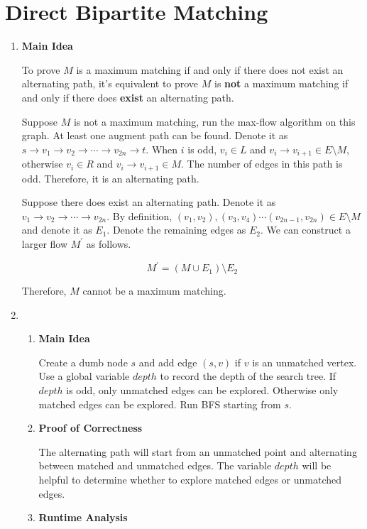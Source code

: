 \documentclass[11pt]{article}
\newenvironment{qparts}{\begin{enumerate}[{(}a{)}]}{\end{enumerate}}
\begin{document}
\newpage
\section{Direct Bipartite Matching}
\begin{qparts}
	\item \textbf{Main Idea}
	
	To prove $M$ is a maximum matching if and only if there does not exist an alternating path, it's equivalent to prove $M$ is \textbf{not} a maximum matching if and only if there does \textbf{exist} an alternating path.
	
	Suppose $M$ is not a maximum matching, run the max-flow algorithm on this graph. At least one augment path can be found. Denote it as $s \to v_1 \to v_2 \to \cdots \to v_{2n} \to t$. When $i$ is odd, $v_i \in L$ and $v_i \to v_{i+1} \in E \setminus M$, otherwise $v_i \in R$ and $v_i \to v_{i+1} \in M$. The number of edges in this path is odd. Therefore, it is an alternating path.
	
	Suppose there does exist an alternating path. Denote it as $v_1 \to v_2 \to \cdots \to v_{2n}$. By definition, $(v_1, v_2), (v_3, v_4) \cdots (v_{2n-1}, v_{2n}) \in E \setminus M$ and denote it as $E_1$. Denote the remaining edges as $E_2$. We can construct a larger flow $M^\prime$ as follows.
	
	\[
		M^\prime = (M \cup E_1) \setminus E_2
	\]
	
	Therefore, $M$ cannot be a maximum matching.
	
	\item
	\renewcommand{\theenumii}{\roman{enumii}}
	\begin{enumerate}
		\item \textbf{Main Idea}
		
		Create a dumb node $s$ and add edge $(s, v)$ if $v$ is an unmatched vertex. Use a global variable $depth$ to record the depth of the search tree. If $depth$ is odd, only unmatched edges can be explored. Otherwise only matched edges can be explored. Run BFS starting from $s$.
		
		\item \textbf{Proof of Correctness}
		
		The alternating path will start from an unmatched point and alternating between matched and unmatched edges. The variable $depth$ will be helpful to determine whether to explore matched edges or unmatched edges.
		
		\item \textbf{Runtime Analysis}
		

\end{enumerate}
\end{qparts}
\end{document}
